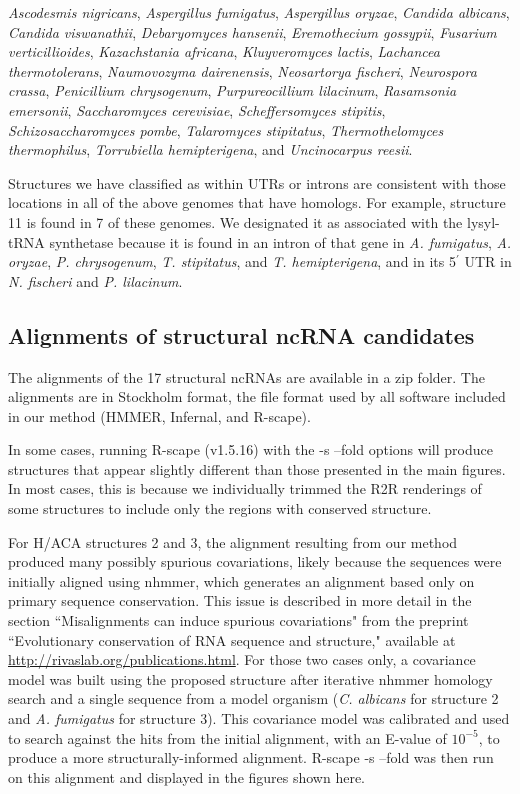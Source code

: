 \documentclass[12pt]{report}
\begin{document}
\textit{Ascodesmis nigricans}, \textit{Aspergillus fumigatus}, \textit{Aspergillus oryzae}, \textit{Candida albicans}, \textit{Candida viswanathii}, \textit{Debaryomyces hansenii}, \textit{Eremothecium gossypii}, \textit{Fusarium verticillioides},
\textit{Kazachstania africana}, \textit{Kluyveromyces lactis}, 
\textit{Lachancea thermotolerans}, \textit{Naumovozyma dairenensis},
\textit{Neosartorya fischeri}, \textit{Neurospora crassa}, \textit{Penicillium chrysogenum}, \textit{Purpureocillium lilacinum}, \textit{Rasamsonia emersonii}, \textit{Saccharomyces cerevisiae}, \textit{Scheffersomyces stipitis}, \textit{Schizosaccharomyces pombe},
\textit{Talaromyces stipitatus}, \textit{Thermothelomyces thermophilus}, 
\textit{Torrubiella hemipterigena}, and \textit{Uncinocarpus reesii}.

Structures we have classified as within UTRs or introns are consistent with those locations in all of the above genomes that have homologs. For example, structure 11 is found in 7 of these genomes. We designated it as associated with the lysyl-tRNA synthetase because it is found in an intron of that gene in \textit{A. fumigatus}, \textit{A. oryzae}, \textit{P. chrysogenum}, \textit{T. stipitatus}, and \textit{T. hemipterigena}, and in its 5$^\prime$ UTR in \textit{N. fischeri} and \textit{P. lilacinum}. 

\subsection{Alignments of structural ncRNA candidates}

The alignments of the 17 structural ncRNAs are available in a zip folder. The alignments are in Stockholm format, the file format used by all software included in our method (HMMER, Infernal, and R-scape). 

In some cases, running R-scape (v1.5.16) with the -s --fold options will produce structures that appear slightly different than those presented in the main figures. In most cases, this is because we individually trimmed the R2R renderings of some structures to include only the regions with conserved structure.

For H/ACA structures 2 and 3, the alignment resulting from our method produced many possibly spurious covariations, likely because the sequences were initially aligned using nhmmer, which generates an alignment based only on primary sequence conservation. This issue is described in more detail in the section ``Misalignments can induce spurious covariations" from the preprint ``Evolutionary conservation of RNA sequence and structure," available at \url{http://rivaslab.org/publications.html}.  For those two cases only, a covariance model was built using the proposed structure after iterative nhmmer homology search and a single sequence from a model organism (\textit{C. albicans} for structure 2 and \textit{A. fumigatus} for structure 3). This covariance model was calibrated and used to search against the hits from the initial alignment, with an E-value of $10^{-5}$, to produce a more structurally-informed alignment. R-scape -s --fold was then run on this alignment and displayed in the figures shown here.
\end{document}
